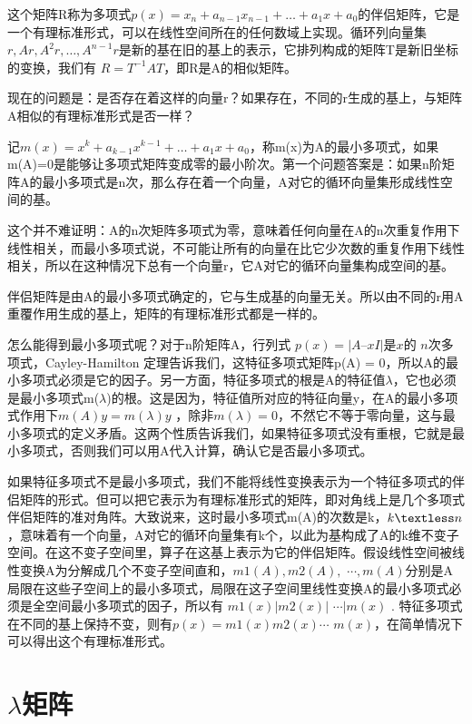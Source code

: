 	这个矩阵R称为多项式$  p(x) =x_n +a_{n-1}x_{n-1} + … + a_1x + a_0 $的伴侣矩阵，它是一个有理标准形式，可以在线性空间所在的任何数域上实现。循环列向量集 $ {r , Ar, A^2r, …, A^{n-1}r}  $是新的基在旧的基上的表示，它排列构成的矩阵T是新旧坐标的变换，我们有 $ R = T^{-1}AT $，即R是A的相似矩阵。
	
	现在的问题是：是否存在着这样的向量r？如果存在，不同的r生成的基上，与矩阵A相似的有理标准形式是否一样？
	
	记$ m(x) = x^k+a_{k-1}x^{k-1} + … + a_1x + a_0 $，称m(x)为A的最小多项式，如果m(A)=0是能够让多项式矩阵变成零的最小阶次。第一个问题答案是：如果n阶矩阵A的最小多项式是n次，那么存在着一个向量，A对它的循环向量集形成线性空间的基。
	
	这个并不难证明：A的n次矩阵多项式为零，意味着任何向量在A的n次重复作用下线性相关，而最小多项式说，不可能让所有的向量在比它少次数的重复作用下线性相关，所以在这种情况下总有一个向量r，它A对它的循环向量集构成空间的基。
	
	伴侣矩阵是由A的最小多项式确定的，它与生成基的向量无关。所以由不同的r用A重覆作用生成的基上，矩阵的有理标准形式都是一样的。
	
	怎么能得到最小多项式呢？对于n阶矩阵A，行列式 $ p(x)  = |A – xI| $是$ x $的 $ n $次多项式，Cayley-Hamilton 定理告诉我们，这特征多项式矩阵p(A) = 0，所以A的最小多项式必须是它的因子。另一方面，特征多项式的根是A的特征值$ \lambda $，它也必须是最小多项式m($ \lambda $)的根。这是因为，特征值所对应的特征向量y，在A的最小多项式作用下$  m(A)y = m(\lambda)y $ ，除非$ m(\lambda)=0 $，不然它不等于零向量，这与最小多项式的定义矛盾。这两个性质告诉我们，如果特征多项式没有重根，它就是最小多项式，否则我们可以用A代入计算，确认它是否最小多项式。
	
	如果特征多项式不是最小多项式，我们不能将线性变换表示为一个特征多项式的伴侣矩阵的形式。但可以把它表示为有理标准形式的矩阵，即对角线上是几个多项式伴侣矩阵的准对角阵。大致说来，这时最小多项式m(A)的次数是k，$ k  \textless n $，意味着有一个向量，A对它的循环向量集有k个，以此为基构成了A的k维不变子空间。在这不变子空间里，算子在这基上表示为它的伴侣矩阵。假设线性空间被线性变换A为分解成几个不变子空间直和，$ m1(A), m2(A),$   $\cdots, m(A) $分别是A局限在这些子空间上的最小多项式，局限在这子空间里线性变换A的最小多项式必须是全空间最小多项式的因子，所以有 $ m1(x) | m2(x) |$   $\cdots | m(x) $ . 特征多项式在不同的基上保持不变，则有$ p(x)= m1(x) m2(x) \cdots$   $m(x) $，在简单情况下可以得出这个有理标准形式。
	
	\section{$\lambda$矩阵}
	
